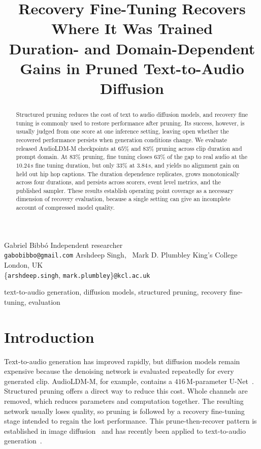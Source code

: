 \documentclass{article}
\begin{document}
\ninept

\title{Recovery Fine-Tuning Recovers Where It Was Trained\\
Duration- and Domain-Dependent Gains in Pruned Text-to-Audio Diffusion}

\twoauthors
  {Gabriel Bibb\'o}
  {Independent researcher \\
   \texttt{gabobibbo@gmail.com}}
  {Arshdeep Singh, \, Mark D. Plumbley}
  {King's College London, UK \\
   \{\texttt{arshdeep.singh}, \texttt{mark.plumbley}\}\texttt{@kcl.ac.uk}}

\maketitle

\begin{abstract}
Structured pruning reduces the cost of text to audio diffusion models, and recovery fine tuning is commonly used to restore performance after pruning. Its success, however, is usually judged from one score at one inference setting, leaving open whether the recovered performance persists when generation conditions change. We evaluate released AudioLDM-M checkpoints at $65\%$ and $83\%$ pruning across clip duration and prompt domain. At $83\%$ pruning, fine tuning closes $63\%$ of the gap to real audio at the $10.24$\,s fine tuning duration, but only $33\%$ at $3.84$\,s, and yields no alignment gain on held out hip hop captions. The duration dependence replicates, grows monotonically across four durations, and persists across scorers, event level metrics, and the published sampler. These results establish operating point coverage as a necessary dimension of recovery evaluation, because a single setting can give an incomplete account of compressed model quality.
\end{abstract}

\begin{keywords}
text-to-audio generation, diffusion models, structured pruning, recovery fine-tuning, evaluation
\end{keywords}

\section{Introduction}
Text-to-audio generation has improved rapidly, but diffusion models remain expensive because the denoising network is evaluated repeatedly for every generated clip. AudioLDM-M, for example, contains a $416$\,M-parameter U-Net~\cite{liu2023audioldm}. Structured pruning offers a direct way to reduce this cost. Whole channels are removed, which reduces parameters and computation together. The resulting network usually loses quality, so pruning is followed by a recovery fine-tuning stage intended to regain the lost performance. This prune-then-recover pattern is established in image diffusion~\cite{fang2023diffpruning,kim2024bksdm,fang2025tinyfusion} and has recently been applied to text-to-audio generation~\cite{singh2026pruning}.
\end{document}
